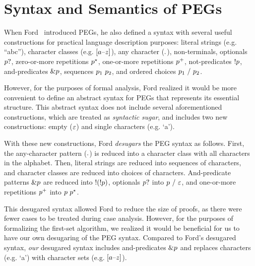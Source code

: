 \chapter{Syntax and Semantics of PEGs}
\label{chapter:pegs}

When Ford~\cite{ford_parsing_2004} introduced PEGs,
he also defined a syntax
with several useful constructions
for practical language description purposes:
literal strings (e.g. ``abc''),
character classes (e.g. $[a\text{--}z]$), any character ($.{}$),
non-terminals,
optionals $p?$, zero-or-more repetitions $p^\star$,
one-or-more repetitions $p^+$, not-predicates $!p$,
and-predicates $\&p$, sequences $p_1\ p_2$,
and ordered choices $p_1\ /\ p_2$.

However, for the purposes of formal analysis,
Ford realized it would be more
convenient to define an abstract syntax for PEGs
that represents its essential structure.
This abstract syntax does not include
several aforementioned constructions,
which are treated as \emph{syntactic sugar},
and includes two new constructions:
empty ($\varepsilon$) and single characters (e.g. `a').

With these new constructions,
Ford \emph{desugars} the PEG syntax as follows.
First, the any-character pattern ($.{}$) is reduced
into a character class with all characters in the alphabet.
Then, literal strings are reduced into sequences of characters,
and character classes are reduced into choices of characters.
And-predicate patterns $\&p$ are reduced into $!(!p)$,
optionals $p?$ into $p\ /\ \varepsilon$,
and one-or-more repetitions $p^+$ into $p\ p^\star$.

This desugared syntax allowed Ford to reduce the size of proofs,
as there were fewer cases to be treated during case analysis.
However, for the purposes of formalizing the first-set algorithm,
we realized it would be beneficial for us to have our own
desugaring of the PEG syntax.
Compared to Ford's desugared syntax,
\emph{our} desugared syntax
includes and-predicates $\&p$
and replaces characters (e.g. `a')
with character sets (e.g. $[a\text{--}z]$).

